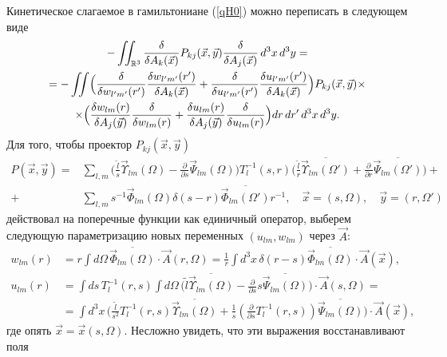\documentclass[12pt]{article}
\newcommand{\pl}{\partial}
\newcommand{\ol}{\overline}
\newcommand{\RR}{\mathbb{R}}
\begin{document}
    Кинетическое слагаемое в гамильтониане
(\ref{qH0})
    можно переписать в следующем виде
\begin{multline}
\label{qHkin}
    - \iint_{\RR^{3}} \frac{\delta}{\delta A_{k}(\vec{x})}
	P_{kj}(\vec{x},\vec{y}) \frac{\delta}{\delta A_{j}(\vec{x})}
	\, d^{3}x\, d^{3}y =\\
    = -\iint\Bigl(
\frac{\delta}{\delta w_{l'm'}(r')} \frac{\delta w_{l'm'}(r')}{
    \delta A_{k}(\vec{x})}
+\frac{\delta}{\delta u_{l'm'}(r')}\frac{\delta u_{l'm'}(r')}{
    \delta A_{k}(\vec{x})} \Bigr) P_{kj}(\vec{x},\vec{y}) \times \\
    \times \Bigl(
\frac{\delta w_{lm}(r)}{\delta A_{j}(\vec{y})}
    \frac{\delta}{\delta w_{lm}(r)}
+\frac{\delta u_{lm}(r)}{\delta A_{j}(\vec{y})} \frac{\delta}{\delta u_{lm}(r)}
    \Bigr) dr\, dr'\, d^{3}x\, d^{3}y .
\end{multline}
    Для того, чтобы проектор
$ P_{kj}(\vec{x},\vec{y}) $
\begin{align*}
    P(\vec{x},\vec{y}) =& \sum_{l,m}
\bigl(\frac{\tilde{l}}{s} \vec{\Upsilon}_{lm}(\Omega)
    - \frac{\pl}{\pl s} \vec{\Psi}_{lm}(\Omega) \bigr) T^{-1}_{l}(s,r)
\bigl(\frac{\tilde{l}}{r} \ol{\vec{\Upsilon}_{lm}(\Omega')}
    + \frac{\pl}{\pl r} \ol{\vec{\Psi}_{lm}(\Omega')} \bigr) +\\
 +& \sum_{l,m} s^{-1} \vec{\Phi}_{lm}(\Omega) \delta(s-r)
	\ol{\vec{\Phi}_{lm}(\Omega')} r^{-1} ,
    \quad \vec{x} = (s,\Omega) , \quad \vec{y} = (r, \Omega')
\end{align*}
    действовал на поперечные функции
    как единичный оператор, выберем следующую параметризацию
    новых переменных
$ (u_{lm}, w_{lm}) $
    через
$ \vec{A} $:
\begin{align}
\label{dphiA}
    w_{lm}(r) &= r\int d\Omega \, \ol{\vec{\Phi}_{lm}(\Omega)}\cdot
	\vec{A}(r,\Omega)
	= \frac{1}{r} \int d^{3}x \, \delta(r-s) \ol{\vec{\Phi}_{lm}(\Omega)} \cdot
	    \vec{A}(\vec{x}) , \\
\nonumber
    u_{lm}(r) &= \int ds \, T_{l}^{-1}(r,s) \int d\Omega \,\bigl(
	\tilde{l}\ol{\vec{\Upsilon}_{lm}(\Omega)}
	    -\frac{\pl}{\pl s}s\ol{\vec{\Psi}_{lm}(\Omega)}
	\bigr) \cdot \vec{A}(s,\Omega) =\\
\label{duA}
    &= \int d^{3}x \,
	\bigl(\frac{\tilde{l}}{s^{2}}T_{l}^{-1}(r,s)
	    \ol{\vec{\Upsilon}_{lm}(\Omega)}
+\frac{1}{s}(\frac{\pl}{\pl s}T_{l}^{-1}(r,s))\ol{\vec{\Psi}_{lm}(\Omega)}
	\bigr) \cdot \vec{A}(\vec{x}) ,
\end{align}
    где опять
$ \vec{x} = \vec{x}(s,\Omega) $.
    Несложно увидеть, что эти выражения восстанавливают поля
\end{document}
